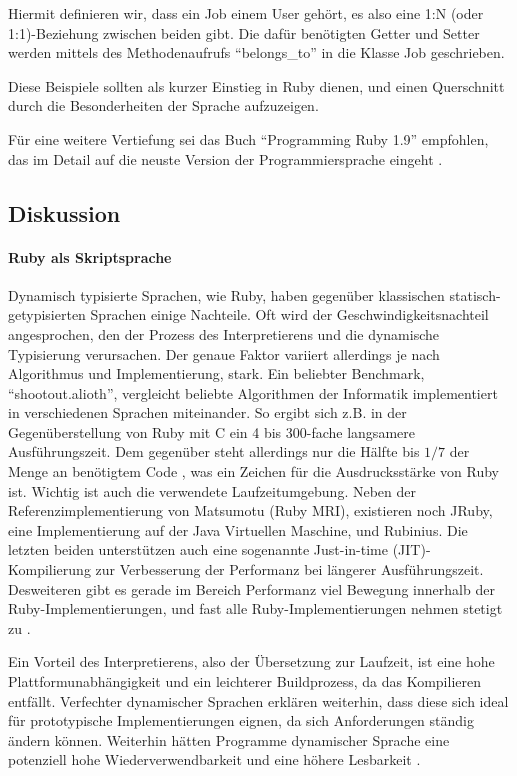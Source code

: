 Hiermit definieren wir, dass ein Job einem User gehört, es also eine 1:N (oder 1:1)-Beziehung zwischen beiden gibt. Die dafür benötigten Getter und Setter werden mittels des Methodenaufrufs "`belongs\_to"' in die Klasse Job geschrieben.

Diese Beispiele sollten als kurzer Einstieg in Ruby dienen, und einen Querschnitt durch die Besonderheiten der Sprache aufzuzeigen.

Für eine weitere Vertiefung sei das Buch "`Programming Ruby 1.9"' empfohlen, das im Detail auf die neuste Version der Programmiersprache eingeht \citep{hunt_programming_2009}.



\subsection{Diskussion}

\paragraph{Ruby als Skriptsprache}
Dynamisch typisierte Sprachen, wie Ruby, haben gegenüber klassischen statisch-getypisierten Sprachen einige Nachteile. Oft wird der Geschwindigkeitsnachteil angesprochen, den der Prozess des Interpretierens und die dynamische Typisierung verursachen. 
Der genaue Faktor variiert allerdings je nach Algorithmus und Implementierung, stark. Ein beliebter Benchmark, "`shootout.alioth"', vergleicht beliebte Algorithmen der Informatik implementiert in verschiedenen Sprachen miteinander. So ergibt sich z.B. in der Gegenüberstellung von Ruby mit C ein 4 bis 300-fache langsamere Ausführungszeit. Dem gegenüber steht allerdings nur die Hälfte bis $1/7$ der Menge an benötigtem Code \citep{computer_language_benchmarks_game_ruby_2011}, was ein Zeichen für die Ausdrucksstärke von Ruby ist. Wichtig ist auch die verwendete Laufzeitumgebung. Neben der Referenzimplementierung von Matsumotu (Ruby MRI), existieren noch JRuby, eine Implementierung auf der Java Virtuellen Maschine, und Rubinius. Die letzten beiden unterstützen auch eine sogenannte Just-in-time (JIT)-Kompilierung zur Verbesserung der Performanz bei längerer Ausführungszeit. Desweiteren gibt es gerade im Bereich Performanz viel Bewegung innerhalb der Ruby-Implementierungen, und fast alle Ruby-Implementierungen nehmen stetigt zu \citep{antonio_cangiano_great_2010}.

Ein Vorteil des Interpretierens, also der Übersetzung zur Laufzeit, ist eine hohe Plattformunabhängigkeit und ein leichterer Buildprozess, da das Kompilieren entfällt. 
Verfechter dynamischer Sprachen erklären weiterhin, dass diese sich ideal für prototypische Implementierungen eignen, da sich Anforderungen ständig ändern können. Weiterhin hätten Programme dynamischer Sprache eine potenziell hohe Wiederverwendbarkeit und eine höhere Lesbarkeit \citep{meijer_static_2005} \citep{ousterhout_scripting:_1998}.

